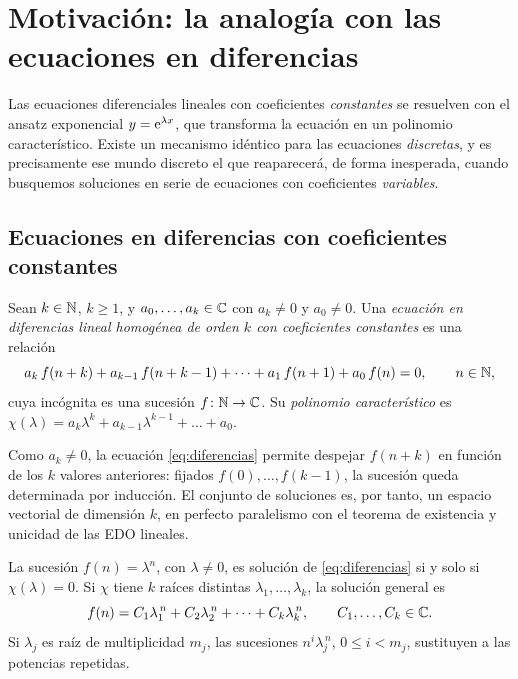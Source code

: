 \section{Motivación: la analogía con las ecuaciones en diferencias}\label{sec:motivacion}

Las ecuaciones diferenciales lineales con coeficientes \emph{constantes} se
resuelven con el ansatz exponencial $y=\mathrm{e}^{\lambda x}$, que transforma la
ecuación en un polinomio característico. Existe un mecanismo idéntico para
las ecuaciones \emph{discretas}, y es precisamente ese mundo discreto el que
reaparecerá, de forma inesperada, cuando busquemos soluciones en serie de
ecuaciones con coeficientes \emph{variables}.

\subsection{Ecuaciones en diferencias con coeficientes constantes}\label{sec:diferencias}

\begin{definicion}\label{def:diferencias}
Sean $k\in\mathbb{N}$, $k\ge 1$, y $a_0,\dots,a_k\in\mathbb{C}$ con $a_k\neq 0$ y $a_0\neq0$.
Una \emph{ecuación en diferencias lineal homogénea de orden $k$ con
coeficientes constantes} es una relación
\begin{equation}\label{eq:diferencias}
  a_k\,f(n+k)+a_{k-1}\,f(n+k-1)+\dots+a_1\,f(n+1)+a_0\,f(n)=0,
  \qquad n\in\mathbb{N} ,
\end{equation}
cuya incógnita es una sucesión $f\colon\mathbb{N}\to\mathbb{C}$. Su \emph{polinomio
característico} es $\chi(\lambda)=a_k\lambda^k+a_{k-1}\lambda^{k-1}+\dots+a_0$.
\end{definicion}

Como $a_k\neq 0$, la ecuación \eqref{eq:diferencias} permite despejar
$f(n+k)$ en función de los $k$ valores anteriores: fijados
$f(0),\dots,f(k-1)$, la sucesión queda determinada por inducción. El conjunto
de soluciones es, por tanto, un espacio vectorial de dimensión $k$, en
perfecto paralelismo con el teorema de existencia y unicidad de las EDO
lineales.

\begin{proposicion}\label{prop:ansatz-discreto}
La sucesión $f(n)=\lambda^n$, con $\lambda\neq0$, es solución de
\eqref{eq:diferencias} si y solo si $\chi(\lambda)=0$. Si $\chi$ tiene $k$
raíces distintas $\lambda_1,\dots,\lambda_k$, la solución general es
\begin{equation}\label{eq:sol-diferencias}
  f(n)=C_1\lambda_1^{\,n}+C_2\lambda_2^{\,n}+\dots+C_k\lambda_k^{\,n},
  \qquad C_1,\dots,C_k\in\mathbb{C} .
\end{equation}
Si $\lambda_j$ es raíz de multiplicidad $m_j$, las sucesiones
$n^{i}\lambda_j^{\,n}$, $0\le i<m_j$, sustituyen a las potencias repetidas.
\end{proposicion}


